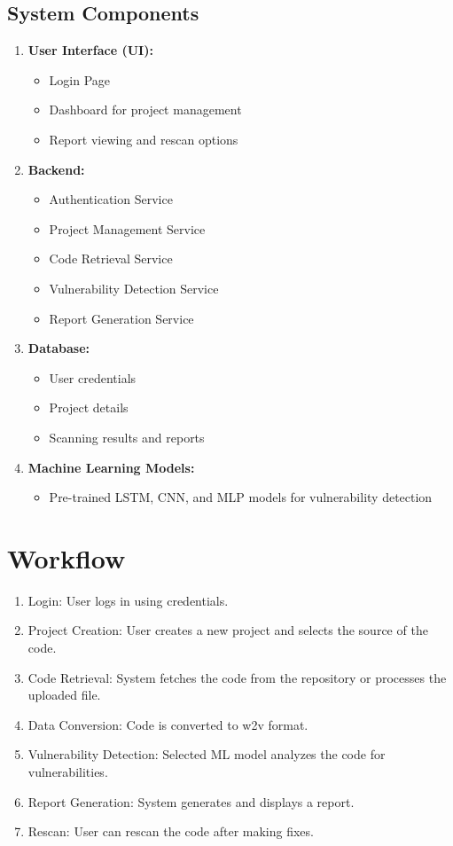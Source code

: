 \subsection*{System Components}
\begin{enumerate}
    \item \textbf{User Interface (UI):}
    \begin{itemize}
        \item Login Page
        \item Dashboard for project management
        \item Report viewing and rescan options
    \end{itemize}
    \item \textbf{Backend:}
    \begin{itemize}
        \item Authentication Service
        \item Project Management Service
        \item Code Retrieval Service
        \item Vulnerability Detection Service
        \item Report Generation Service
    \end{itemize}
    \item \textbf{Database:}
    \begin{itemize}
        \item User credentials
        \item Project details
        \item Scanning results and reports
    \end{itemize}
    \item \textbf{Machine Learning Models:}
    \begin{itemize}
        \item Pre-trained LSTM, CNN, and MLP models for vulnerability detection
    \end{itemize}
\end{enumerate}

\section*{Workflow}
\begin{enumerate}
    \item Login: User logs in using credentials.
    \item Project Creation: User creates a new project and selects the source of the code.
    \item Code Retrieval: System fetches the code from the repository or processes the uploaded file.
    \item Data Conversion: Code is converted to w2v format.
    \item Vulnerability Detection: Selected ML model analyzes the code for vulnerabilities.
    \item Report Generation: System generates and displays a report.
    \item Rescan: User can rescan the code after making fixes.
\end{enumerate}


